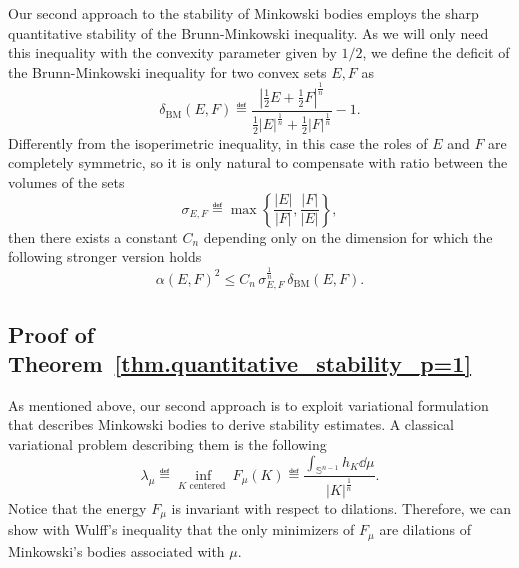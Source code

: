 \documentclass[a4paper, 10pt, twoside]{amsart}
\numberwithin{equation}{section}
\theoremstyle{plain}
\theoremstyle{definition}
\DeclareMathOperator{\BM}{\mathrm{BM}}
\begin{document}
Our second approach to the stability of Minkowski bodies employs the sharp quantitative stability of the Brunn-Minkowski inequality. As we will only need this inequality with the convexity parameter given by $1/2$, we define the deficit of the Brunn-Minkowski inequality for two convex sets $E,F$ as 
\begin{equation}\label{eq.deficit_BM}
    \delta_{\BM}(E,F) 
    \eqdef 
    \frac{
        \left|\frac{1}{2}E + \frac{1}{2}F\right|^{\frac{1}{n}} 
    }{
        \frac{1}{2}|E|^{\frac{1}{n}} + 
        \frac{1}{2}|F|^{\frac{1}{n}}}
    - 1.
\end{equation}
Differently from the isoperimetric inequality, in this case the roles of $E$ and $F$ are completely symmetric, so it is only natural to compensate with ratio between the volumes of the sets 
\[
    \sigma_{E,F} 
    \eqdef 
    \max 
    \left\{
      \frac{|E|}{|F|},\frac{|F|}{|E|}  
    \right\},
\]
then there exists a constant $C_n$ depending only on the dimension for which the following stronger version holds
\begin{equation}\label{eq.quantitative_BM}
    {\alpha(E,F)}^2 \le C_n\,\sigma^{\frac{1}{n}}_{E,F}\,\delta_{\BM}(E,F). 
\end{equation}

\subsection{Proof of Theorem~\ref{thm.quantitative_stability_p=1} %
}\label{sec.p=1_variational}

As mentioned above, our second approach is to exploit variational formulation that describes Minkowski bodies to derive stability estimates. A classical variational problem describing them is the following 
\begin{equation}\label{eq.classical_var_Minko}
    \lambda_\mu \eqdef 
    \inf_{K \text{ centered }} 
    F_\mu(K) 
    \eqdef 
    \frac{
        \displaystyle
        \int_{\mathbb{S}^{n-1}} h_K \dd \mu
    }{|K|^{\frac{1}{n}}}.
\end{equation}
Notice that the energy $F_\mu$ is invariant with respect to dilations. Therefore, we can show with Wulff's inequality that the only minimizers of $F_\mu$ are dilations of Minkowski's bodies associated with $\mu$. 
\end{document}
